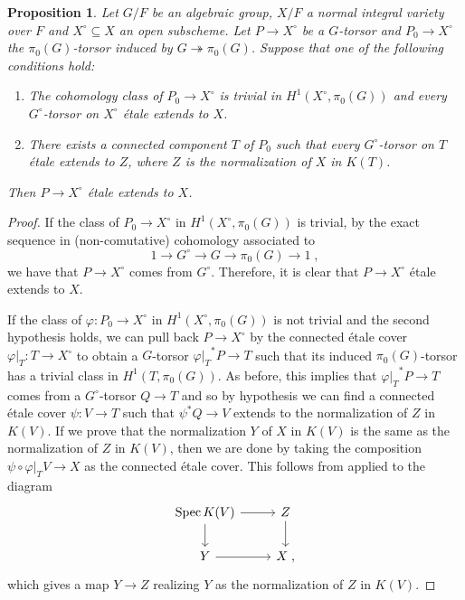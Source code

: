 \documentclass[a4paper,english,12pt]{amsart}
\newtheorem{proposition}[definition]{Proposition}
\numberwithin{equation}{section}
\newcommand{\restr}[2]{\ensuremath{\left.#1\right|_{#2}}}
\DeclareMathOperator{\Spec}{Spec}
\renewcommand{\_}{\rule{0.25cm}{0.4pt}}
\begin{document}
\begin{proposition}\label{reduction to connected}
    Let $G/F$ be an algebraic group, $X/F$ a normal integral variety over $F$ and $X^{\circ}\subseteq X$ an open subscheme. Let $P\to X^{\circ}$ be a $G$-torsor and $P_{0}\to X^{\circ}$ the $\pi_{0}(G)$-torsor induced by $G\twoheadrightarrow \pi_{0}(G)$. Suppose that one of the following conditions hold:
    \begin{enumerate}
        \item The cohomology class of $P_{0}\to X^{\circ}$ is trivial in $H^{1}(X^{\circ},\pi_{0}(G))$ and every $G^{\circ}$-torsor on $X^{\circ}$ étale extends to $X$.
        \item There exists a connected component $T$ of $P_{0}$ such that every $G^{\circ}$-torsor on $T$ étale extends to $Z$, where $Z$ is the normalization of $X$ in $K(T)$.
    \end{enumerate}
     Then $P\to X^{\circ}$ étale extends to $X$.
\end{proposition}
\begin{proof}
    If the class of $P_{0}\to X^{\circ}$ in $H^{1}(X^{\circ},\pi_{0}(G))$ is trivial, by the exact sequence in (non-comutative) cohomology associated to
    \[
    1\to G^{\circ}\to G\to \pi_{0}(G)\to 1\;,
    \]
    we have that $P\to X^{\circ}$ comes from $G^{\circ}$. Therefore, it is clear that $P\to X^{\circ}$ étale extends to $X$. 
    
    If the class of $\varphi\colon P_{0}\to X^{\circ}$ in $H^{1}(X^{\circ},\pi_{0}(G))$ is not trivial and the second hypothesis holds, we can pull back $P\to X^{\circ}$ by the connected étale cover $\restr{\varphi}{T}\colon T\to X^{\circ}$ to obtain a $G$-torsor $\restr{\varphi}{T}^{\ast}P\to T$ such that its induced $\pi_{0}(G)$-torsor has a trivial class in $H^{1}(T,\pi_{0}(G))$. As before, this implies that $\restr{\varphi}{T}^{\ast}P\to T$ comes from a $G^{\circ}$-torsor $Q\to T$ and so by hypothesis we can find a connected étale cover $\psi\colon V\to T$ such that $\psi^{\ast}Q\to V$ extends to the normalization of $Z$ in $K(V)$.
    If we prove that the normalization $Y$ of $X$ in $K(V)$ is the same as the normalization of $Z$ in $K(V)$, then we are done by taking the composition $\psi\circ \restr{\varphi}{T}V\to X$ as the connected étale cover. This follows from \cite[\href{https://stacks.math.columbia.edu/tag/035I}{Tag 035I}]{stacks-project} applied to the diagram
    \[
    \begin{tikzcd}
        \Spec K(V)\ar[r]\ar[d] & Z\ar[d]
        \\
        Y\ar[r] & X\;,
    \end{tikzcd}
    \]
    which gives a map $Y\to Z$ realizing $Y$ as the normalization of $Z$ in $K(V)$.
\end{proof}
\end{document}
